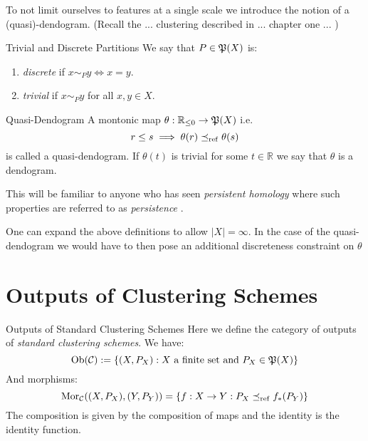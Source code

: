 To not limit ourselves to features at a single scale we introduce the notion of a (quasi)-dendogram. 
(Recall the ... clustering described in ... chapter one ... \todo)

\begin{definition}{Trivial and Discrete Partitions}{}
We say that $P \in \P(X)$ is:
\begin{enumerate}
    \item \emph{discrete} if $x \sim_P y \iff x = y$.
    \item \emph{trivial} if $x \sim_P y$ for all $x,y \in X$.
\end{enumerate}
\end{definition}

\begin{definition}{Quasi-Dendogram}{}
A montonic map $\theta: \R_{\leq0} \to \mathfrak{P}(X)$ i.e.
\begin{equation*}
    r \leq s \implies  \theta(r) \refines \theta(s)
\end{equation*}
is called a quasi-dendogram. If $\theta(t)$ is trivial for some $t \in \mathbb{R}$ we say that $\theta$ is a dendogram.
\end{definition}

This will be familiar to anyone who has seen \emph{persistent homology} where such properties are referred to as \emph{persistence} \source. 

\begin{myremark}{}{}
\source One can expand the above definitions to allow $|X| = \infty$. 
In the case of the quasi-dendogram we would have to then pose an additional discreteness constraint on $\theta$
\end{myremark}

\section{Outputs of Clustering Schemes}

\begin{definition}{Outputs of Standard Clustering Schemes}{}
Here we define the category of outputs of \emph{standard clustering schemes}. We have:
\begin{equation*}
    \ob(\C) := \{(X, P_X): X \text{ a finite set and } P_X \in \P(X)\}
\end{equation*}
And morphisms:
\begin{equation*}
    \mor_\C((X, P_X), (Y,P_Y)) = \{f: X \to Y: P_X \refines f_*(P_Y)\}
\end{equation*}
The composition is given by the composition of maps and the identity is the identity function.
\end{definition}

